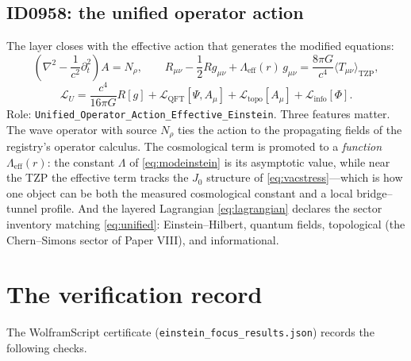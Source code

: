 \documentclass[11pt]{article}
\theoremstyle{remark}
\begin{document}
\subsection{ID0958: the unified operator action}

The layer closes with the effective action that generates the modified equations:
\begin{equation}
\left( \nabla^2 - \frac{1}{c^2}\partial_t^2 \right) A = N_\rho, \qquad
R_{\mu\nu} - \frac{1}{2} R g_{\mu\nu} + \Lambda_{\mathrm{eff}}(r)\, g_{\mu\nu} = \frac{8\pi G}{c^4} \langle T_{\mu\nu} \rangle_{\mathrm{TZP}},
\label{eq:operator}
\end{equation}
\begin{equation}
\mathcal{L}_U = \frac{c^4}{16\pi G} R[g] + \mathcal{L}_{\mathrm{QFT}}[\Psi, A_\mu] + \mathcal{L}_{\mathrm{topo}}[A_\mu] + \mathcal{L}_{\mathrm{info}}[\Phi].
\label{eq:lagrangian}
\end{equation}
Role: \texttt{Unified\_Operator\_Action\_Effective\_Einstein}. Three features matter. The wave operator with source $N_\rho$ ties the action to the propagating fields of the registry's operator calculus. The cosmological term is promoted to a \emph{function} $\Lambda_{\mathrm{eff}}(r)$: the constant $\Lambda$ of \eqref{eq:modeinstein} is its asymptotic value, while near the TZP the effective term tracks the $J_0$ structure of \eqref{eq:vacstress}---which is how one object can be both the measured cosmological constant and a local bridge--tunnel profile. And the layered Lagrangian \eqref{eq:lagrangian} declares the sector inventory matching \eqref{eq:unified}: Einstein--Hilbert, quantum fields, topological (the Chern--Simons sector of Paper VIII), and informational.

\section{The verification record}
\label{sec:wolfram}

The WolframScript certificate (\texttt{einstein\_focus\_results.json}) records the following checks.
\end{document}
